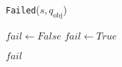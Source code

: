 \begin{algorithm}[H]
\caption{\texttt{Failed}($s, q_\text{obj}$)}\label{algo:Failed}
\begin{algorithmic}[1]

    \State $fail \gets False$
\Else
    \State $fail \gets True$
\EndIf

\State \Return $fail$

\end{algorithmic}
\end{algorithm}
